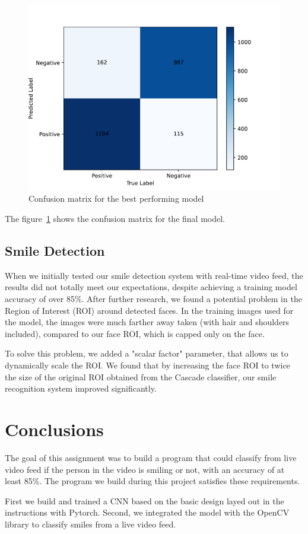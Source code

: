 \documentclass[12pt,a4paper,english
]{tunithesis}
\begin{document}
\begin{figure}
  \centering
  \includegraphics[width=\columnwidth]{img/confusion_matrix_best.pdf}
  \caption{Confusion matrix for the best performing model}
  \label{fig:confusion_matrix_best}
\end{figure}

The figure~\ref{fig:confusion_matrix_best} shows the confusion matrix for the final model.

\section{Smile Detection}
When we initially tested our smile detection system with real-time video feed, the results did not totally meet our expectations, despite achieving a training model accuracy of over 85\%. After further research, we found a potential problem in the Region of Interest (ROI) around detected faces. In the training images used for the model, the images were much farther away taken (with hair and shoulders included), compared to our face ROI, which is capped only on the face.  

To solve this problem, we added a "scalar factor" parameter, that allows us to dynamically scale the ROI. We found that by increasing the face ROI to twice the size of the original ROI obtained from the Cascade classifier, our smile recognition system improved significantly.

\chapter{Conclusions}
\label{ch:conclusions}
The goal of this assignment was to build a program that could classify from live video feed if the person in the video is smiling or not, with an accuracy of at least 85\%. The program we build during this project satisfies these requirements.

First we build and trained a CNN based on the basic design layed out in the instructions with Pytorch.
Second, we integrated the model with the OpenCV library to classify smiles from a live video feed.

%
%
\newpage

\printbibliography[title=References]
\end{document}
